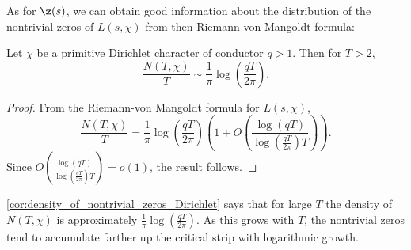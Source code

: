      As for $\z(s)$, we can obtain good information about the distribution of the nontrivial zeros of $L(s,\chi)$ from then Riemann-von Mangoldt formula:

      \begin{corollary}\label{cor:density_of_nontrivial_zeros_Dirichlet}
        Let $\chi$ be a primitive Dirichlet character of conductor $q > 1$. Then for $T > 2$,
        \[
          \frac{N(T,\chi)}{T} \sim \frac{1}{\pi}\log\left(\frac{qT}{2\pi}\right).
        \]
      \end{corollary}
      \begin{proof}
        From the Riemann-von Mangoldt formula for $L(s,\chi)$,
        \[
          \frac{N(T,\chi)}{T} = \frac{1}{\pi}\log\left(\frac{qT}{2\pi}\right)\left(1+O\left(\frac{\log(qT)}{\log\left(\frac{qT}{2\pi}\right)T}\right)\right).
        \]
        Since $O\left(\frac{\log(qT)}{\log\left(\frac{qT}{2\pi}\right)T}\right) = o(1)$, the result follows.
      \end{proof}

      \cref{cor:density_of_nontrivial_zeros_Dirichlet} says that for large $T$ the density of $N(T,\chi)$ is approximately $\frac{1}{\pi}\log\left(\frac{qT}{2\pi}\right)$. As this grows with $T$, the nontrivial zeros tend to accumulate farther up the critical strip with logarithmic growth.
